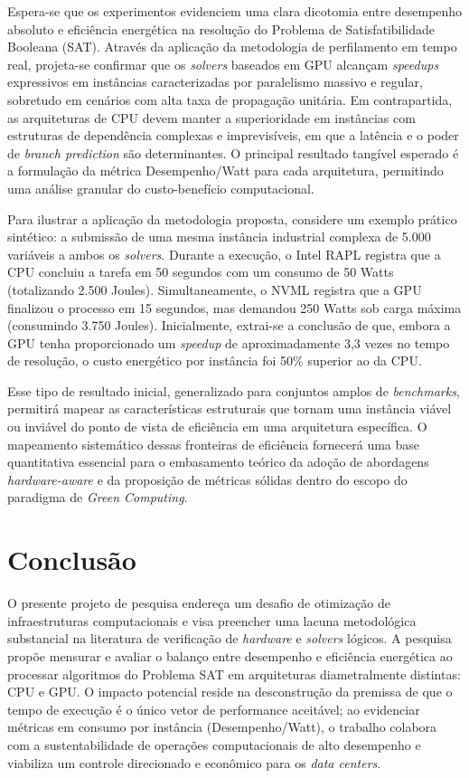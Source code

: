 \documentclass[12pt]{article}
\begin{document}
Espera-se que os experimentos evidenciem uma clara dicotomia entre desempenho absoluto e eficiência energética na resolução do Problema de Satisfatibilidade Booleana (SAT). Através da aplicação da metodologia de perfilamento em tempo real, projeta-se confirmar que os \textit{solvers} baseados em GPU alcançam \textit{speedups} expressivos em instâncias caracterizadas por paralelismo massivo e regular, sobretudo em cenários com alta taxa de propagação unitária. Em contrapartida, as arquiteturas de CPU devem manter a superioridade em instâncias com estruturas de dependência complexas e imprevisíveis, em que a latência e o poder de \textit{branch prediction} são determinantes. O principal resultado tangível esperado é a formulação da métrica Desempenho/Watt para cada arquitetura, permitindo uma análise granular do custo-benefício computacional.

Para ilustrar a aplicação da metodologia proposta, considere um exemplo prático sintético: a submissão de uma mesma instância industrial complexa de 5.000 variáveis a ambos os \textit{solvers}. Durante a execução, o Intel RAPL registra que a CPU concluiu a tarefa em 50 segundos com um consumo de 50 Watts (totalizando 2.500 Joules). Simultaneamente, o NVML registra que a GPU finalizou o processo em 15 segundos, mas demandou 250 Watts sob carga máxima (consumindo 3.750 Joules). Inicialmente, extrai-se a conclusão de que, embora a GPU tenha proporcionado um \textit{speedup} de aproximadamente 3,3 vezes no tempo de resolução, o custo energético por instância foi 50\% superior ao da CPU.

Esse tipo de resultado inicial, generalizado para conjuntos amplos de \textit{benchmarks}, permitirá mapear as características estruturais que tornam uma instância viável ou inviável do ponto de vista de eficiência em uma arquitetura específica. O mapeamento sistemático dessas fronteiras de eficiência fornecerá uma base quantitativa essencial para o embasamento teórico da adoção de abordagens \textit{hardware-aware} e da proposição de métricas sólidas dentro do escopo do paradigma de \textit{Green Computing}.

\section{Conclusão}

O presente projeto de pesquisa endereça um desafio de otimização de infraestruturas computacionais e visa preencher uma lacuna metodológica substancial na literatura de verificação de \textit{hardware} e \textit{solvers} lógicos. A pesquisa propõe mensurar e avaliar o balanço entre desempenho e eficiência energética ao processar algoritmos do Problema SAT em arquiteturas diametralmente distintas: CPU e GPU. O impacto potencial reside na desconstrução da premissa de que o tempo de execução é o único vetor de performance aceitável; ao evidenciar métricas em consumo por instância (Desempenho/Watt), o trabalho colabora com a sustentabilidade de operações computacionais de alto desempenho e viabiliza um controle direcionado e econômico para os \textit{data centers}.
\end{document}
